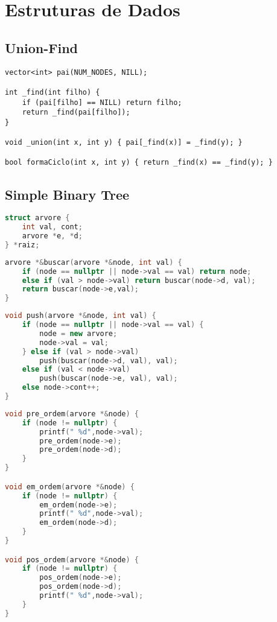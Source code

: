 \chapter{Estruturas de Dados}
\section{Union-Find}
\begin{verbatim}
vector<int> pai(NUM_NODES, NILL);

int _find(int filho) {
    if (pai[filho] == NILL) return filho;
    return _find(pai[filho]);
}
 
void _union(int x, int y) { pai[_find(x)] = _find(y); }

bool formaCiclo(int x, int y) { return _find(x) == _find(y); }
\end{verbatim}

\section{Simple Binary Tree}
\begin{lstlisting}[language=C++, title={Estrutura da Árvore}]
struct arvore {
    int val, cont;
	arvore *e, *d;
} *raiz;
\end{lstlisting}

\begin{lstlisting}[language=C++, title=Retorna um nó com este valor ou nulo]
arvore *&buscar(arvore *&node, int val) {
    if (node == nullptr || node->val == val) return node;
    else if (val > node->val) return buscar(node->d, val);
    return buscar(node->e,val);
}
\end{lstlisting} 

\newpage
\begin{lstlisting}[language=C++, title=Adiciona um novo elemento]
void push(arvore *&node, int val) {
    if (node == nullptr || node->val == val) {
        node = new arvore;
        node->val = val;
    } else if (val > node->val) 
    	push(buscar(node->d, val), val);
    else if (val < node->val) 
    	push(buscar(node->e, val), val);   
    else node->cont++;
}
\end{lstlisting}
\begin{lstlisting}[language=C++, title=Percursos]
void pre_ordem(arvore *&node) {
    if (node != nullptr) {
        printf(" %d",node->val);
        pre_ordem(node->e); 
        pre_ordem(node->d);  
    }
}

void em_ordem(arvore *&node) {
    if (node != nullptr) {
        em_ordem(node->e);
        printf(" %d",node->val);
        em_ordem(node->d);  
    }
}

void pos_ordem(arvore *&node) {
    if (node != nullptr) {
        pos_ordem(node->e);
        pos_ordem(node->d);
        printf(" %d",node->val);    
    } 
}
\end{lstlisting}
\newpage

